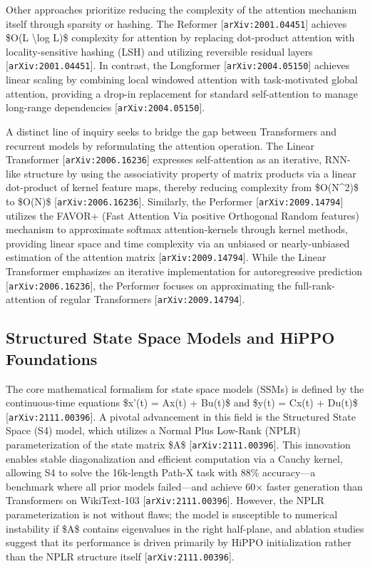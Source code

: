 \documentclass[11pt]{article}
\begin{document}
Other approaches prioritize reducing the complexity of the attention mechanism itself through sparsity or hashing. The Reformer [\texttt{arXiv:2001.04451}] achieves \$O(L \textbackslash{}log L)\$ complexity for attention by replacing dot-product attention with locality-sensitive hashing (LSH) and utilizing reversible residual layers [\texttt{arXiv:2001.04451}]. In contrast, the Longformer [\texttt{arXiv:2004.05150}] achieves linear scaling by combining local windowed attention with task-motivated global attention, providing a drop-in replacement for standard self-attention to manage long-range dependencies [\texttt{arXiv:2004.05150}].

A distinct line of inquiry seeks to bridge the gap between Transformers and recurrent models by reformulating the attention operation. The Linear Transformer [\texttt{arXiv:2006.16236}] expresses self-attention as an iterative, RNN-like structure by using the associativity property of matrix products via a linear dot-product of kernel feature maps, thereby reducing complexity from \$O(N\textasciicircum{}2)\$ to \$O(N)\$ [\texttt{arXiv:2006.16236}]. Similarly, the Performer [\texttt{arXiv:2009.14794}] utilizes the FAVOR+ (Fast Attention Via positive Orthogonal Random features) mechanism to approximate softmax attention-kernels through kernel methods, providing linear space and time complexity via an unbiased or nearly-unbiased estimation of the attention matrix [\texttt{arXiv:2009.14794}]. While the Linear Transformer emphasizes an iterative implementation for autoregressive prediction [\texttt{arXiv:2006.16236}], the Performer focuses on approximating the full-rank-attention of regular Transformers [\texttt{arXiv:2009.14794}].

\subsection{Structured State Space Models and HiPPO Foundations}

The core mathematical formalism for state space models (SSMs) is defined by the continuous-time equations \$x'(t) = Ax(t) + Bu(t)\$ and \$y(t) = Cx(t) + Du(t)\$ [\texttt{arXiv:2111.00396}]. A pivotal advancement in this field is the Structured State Space (S4) model, which utilizes a Normal Plus Low-Rank (NPLR) parameterization of the state matrix \$A\$ [\texttt{arXiv:2111.00396}]. This innovation enables stable diagonalization and efficient computation via a Cauchy kernel, allowing S4 to solve the 16k-length Path-X task with 88\% accuracy—a benchmark where all prior models failed—and achieve 60× faster generation than Transformers on WikiText-103 [\texttt{arXiv:2111.00396}]. However, the NPLR parameterization is not without flaws; the model is susceptible to numerical instability if \$A\$ contains eigenvalues in the right half-plane, and ablation studies suggest that its performance is driven primarily by HiPPO initialization rather than the NPLR structure itself [\texttt{arXiv:2111.00396}].
\end{document}
